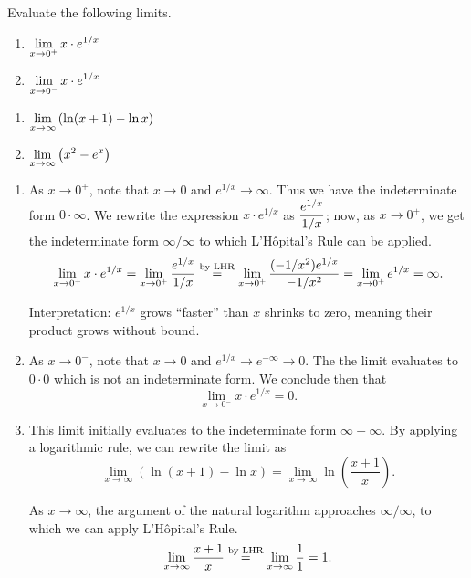 \begin{example}\label{ex_LHR3}%
Evaluate the following limits.\\
\begin{minipage}[t]{.5\textwidth}
\begin{enumerate}
\item		$\displaystyle \lim_{x\to0^+} x\cdot e^{1/x}$
\item		$\displaystyle \lim_{x\to0^-} x\cdot e^{1/x}$
\end{enumerate}
\end{minipage}%
\begin{minipage}[t]{.5\textwidth}
\begin{enumerate}\addtocounter{enumi}{2}
\item		$\displaystyle \lim_{x\to\infty} \left(\ln(x+1)-\ln x\right)$
\item		$\displaystyle \lim_{x\to\infty} \left(x^2-e^x\right)$
\end{enumerate}
\end{minipage}
\solution
\begin{enumerate}
	\item	As $x\to 0^+$, note that $x\to 0$ and $e^{1/x}\to \infty$. Thus we have the indeterminate form $0\cdot\infty$. We rewrite the expression $x\cdot e^{1/x}$ as $\displaystyle\frac{e^{1/x}}{1/x}$; now, as $x\to 0^+$, we get the indeterminate form $\infty/\infty$ to which L'Hôpital's Rule can be applied. 
\[
\lim_{x\to0^+} x\cdot e^{1/x} = \lim_{x\to 0^+} \frac{e^{1/x}}{1/x} \mathrel{\overset{\text{by LHR}}{=}} \lim_{x\to 0^+}\frac{(-1/x^2)e^{1/x}}{-1/x^2} =\lim_{x\to 0^+}e^{1/x} =\infty.
\]

Interpretation: $e^{1/x}$ grows ``faster'' than $x$ shrinks to zero, meaning their product grows without bound.

	\item	As $x\to 0^-$, note that $x\to 0$ and $e^{1/x}\to e^{-\infty}\to 0$. The the limit evaluates to $0\cdot 0$ which is not an indeterminate form. We conclude then that
	\[\lim_{x\to 0^-}x\cdot e^{1/x} = 0.\]

	\item	This limit initially evaluates to the indeterminate form $\infty-\infty$. By applying a logarithmic rule, we can rewrite the limit as 
\[
\lim_{x\to\infty}\left(\ln(x+1)-\ln x\right) = \lim_{x\to \infty} \ln \left(\frac{x+1}x\right).
\]

As $x\to \infty$, the argument of the natural logarithm approaches $\infty/\infty$, to which we can apply L'Hôpital's Rule.
\[\lim_{x\to\infty} \frac{x+1}x \mathrel{\overset{\text{by LHR}}{=}} \lim_{x\to\infty}\frac11=1.
\]


\end{enumerate}
\end{example}
